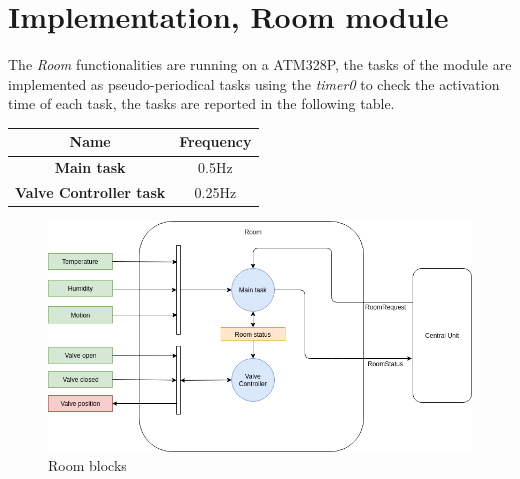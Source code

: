 \section{Implementation, Room module}
The \textit{Room} functionalities are running on a ATM328P, the tasks of the module are implemented as pseudo-periodical tasks using the \textit{timer0} 
to check the activation time of each task, the tasks are reported in the following table.

\begin{center}
	\begin{tabular}{||c | c ||} 
		\hline
		Name 	& Frequency \\ 
		\hline
		\textbf{Main task}			&	0.5Hz \\ 
		\hline
		\textbf{Valve Controller task}	&	0.25Hz \\ 
		\hline
	\end{tabular}
\end{center}

\begin{figure}[h]
	\centering
	\includegraphics[width=12cm,keepaspectratio]{img/Room_description}
	\caption{Room blocks}
	\label{fig:room_description}
\end{figure}

